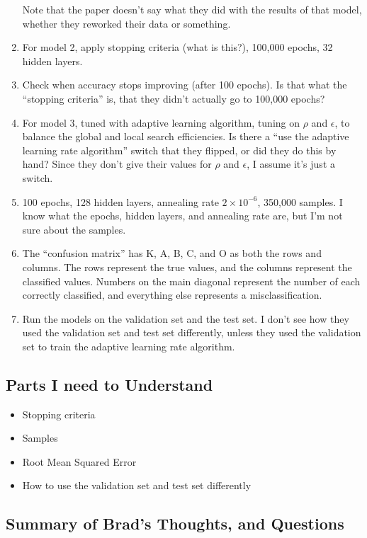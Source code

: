 \documentclass[11pt]{article}
\begin{document}
\begin{spacing}{1.2}
\begin{enumerate}
	Note that the paper doesn't say what they did with the results of that model, whether they reworked their data or something.  
	\item For model 2, apply stopping criteria (what is this?), 100,000 epochs, 32 hidden layers.
	\item Check when accuracy stops improving (after 100 epochs).  Is that what the ``stopping criteria'' is, that they didn't actually go to 100,000 epochs?
	\item For model 3, tuned with adaptive learning algorithm, tuning on $\rho$ and $\epsilon$, to balance the global and local search efficiencies.  Is there a ``use the adaptive learning rate algorithm'' switch that they flipped, or did they do this by hand?  Since they don't give their values for $\rho$ and $\epsilon$, I assume it's just a switch.  
	\item 100 epochs, 128 hidden layers, annealing rate $2 \times 10^{-6}$, 350,000 samples.  I know what the epochs, hidden layers, and annealing rate are, but I'm not sure about the samples.  
	\item The ``confusion matrix''  has K, A, B, C, and O as both the rows and columns.  The rows represent the true values, and the columns represent the classified values.  Numbers on the main diagonal represent the number of each correctly classified, and everything else represents a misclassification.  
	\item Run the models on the validation set and the test set.  I don't see how they used the validation set and test set differently, unless they used the validation set to train the adaptive learning rate algorithm.  
\end{enumerate}

\subsection{Parts I need to Understand}

\begin{itemize}
	\item Stopping criteria
	\item Samples
	\item Root Mean Squared Error
	\item How to use the validation set and test set differently
\end{itemize}

\subsection{Summary of Brad's Thoughts, and Questions}


\end{spacing}
\end{document}

